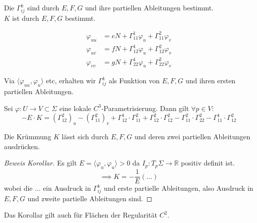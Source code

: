 \documentclass[../main.tex]{subfiles}
\begin{document}
\begin{consequence}
    Die $\Gamma_{ij}^{k}$ sind durch $E,F,G$ und ihre partiellen Ableitungen bestimmt.\\
    $K$ ist durch $E,F,G$ bestimmt.
\end{consequence}
\begin{recall}
    \begin{align*}
        \varphi_{uu} &= eN+\Gamma_{11}^{1}\varphi_{u} + \Gamma_{11}^{2}\varphi_{v}\\
        \varphi_{uv} &= fN+\Gamma_{12}^{1}\varphi_{u} + \Gamma_{12}^{2}\varphi_{v}\\
        \varphi_{vv} &= gN+\Gamma_{22}^{1}\varphi_{u} + \Gamma_{22}^{2}\varphi_{v}
    \end{align*}
\end{recall}
Via $\langle\varphi_{uu},\varphi_{u}\rangle$ etc, erhalten wir $\Gamma_{ij}^{k}$ als Funktion von $E,F,G$ und ihren ersten partiellen Ableitungen.
\begin{lemma}
    Sei $\varphi:U\to V\subset\Sigma$ eine lokale $C^{3}$-Parametrisierung. Dann gilt $\forall p\in V:$
    $$-E\cdot K = (\Gamma_{12}^{2})_{u}-(\Gamma_{11}^{2})_{v}+\Gamma_{12}^{1}\cdot\Gamma_{11}^{2}+\Gamma_{12}^{2}\cdot\Gamma_{12}^{2}-\Gamma_{11}^{2}\cdot\Gamma_{22}^{2}-\Gamma_{11}^{1}\cdot\Gamma_{12}^{2}$$
\end{lemma}
\begin{corollary}
    Die Krümmung $K$ lässt sich durch $E,F,G$ und deren zwei partiellen Ableitungen ausdrücken.
\end{corollary}
\begin{proof}[Beweis Korollar]
    Es gilt $E=\langle\varphi_{u},\varphi_{u}\rangle > 0$ da $I_{p}:T_{p}\Sigma\to\mathbb{R}$ positiv definit ist.
    $$\implies K = -\frac{1}{E}(\dots)$$ wobei die $\dots$ ein Ausdruck in $\Gamma_{ij}^{k}$ und erste partielle Ableitungen, also Ausdruck in $E,F,G$ und zweite partielle Ableitungen sind.
\end{proof}
\begin{remark}
    Das Korollar gilt auch für Flächen der Regularität $C^{2}$.
\end{remark}
\end{document}
